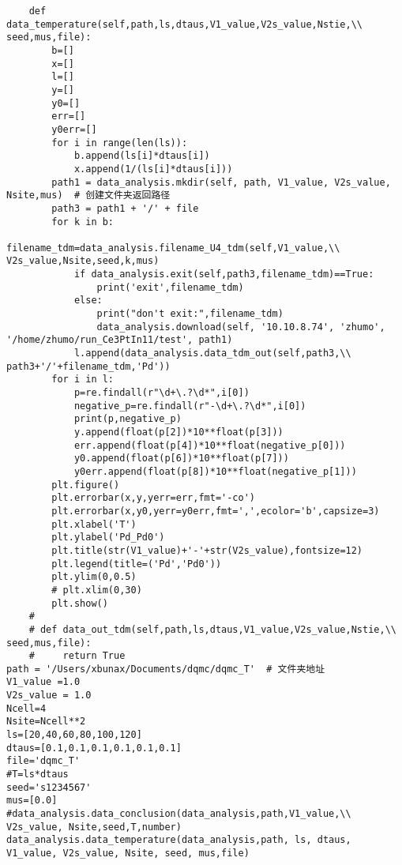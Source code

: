 \begin{description}
\begin{lstlisting}
    def data_temperature(self,path,ls,dtaus,V1_value,V2s_value,Nstie,\\ seed,mus,file):
        b=[]
        x=[]
        l=[]
        y=[]
        y0=[]
        err=[]
        y0err=[]
        for i in range(len(ls)):
            b.append(ls[i]*dtaus[i])
            x.append(1/(ls[i]*dtaus[i]))
        path1 = data_analysis.mkdir(self, path, V1_value, V2s_value, Nsite,mus)  # 创建文件夹返回路径
        path3 = path1 + '/' + file
        for k in b:
            filename_tdm=data_analysis.filename_U4_tdm(self,V1_value,\\ V2s_value,Nsite,seed,k,mus)
            if data_analysis.exit(self,path3,filename_tdm)==True:
                print('exit',filename_tdm)
            else:
                print("don't exit:",filename_tdm)
                data_analysis.download(self, '10.10.8.74', 'zhumo', '/home/zhumo/run_Ce3PtIn11/test', path1)
            l.append(data_analysis.data_tdm_out(self,path3,\\ path3+'/'+filename_tdm,'Pd'))
        for i in l:
            p=re.findall(r"\d+\.?\d*",i[0])
            negative_p=re.findall(r"-\d+\.?\d*",i[0])
            print(p,negative_p)
            y.append(float(p[2])*10**float(p[3]))
            err.append(float(p[4])*10**float(negative_p[0]))
            y0.append(float(p[6])*10**float(p[7]))
            y0err.append(float(p[8])*10**float(negative_p[1]))
        plt.figure()
        plt.errorbar(x,y,yerr=err,fmt='-co')
        plt.errorbar(x,y0,yerr=y0err,fmt=',',ecolor='b',capsize=3)
        plt.xlabel('T')
        plt.ylabel('Pd_Pd0')
        plt.title(str(V1_value)+'-'+str(V2s_value),fontsize=12)
        plt.legend(title=('Pd','Pd0'))
        plt.ylim(0,0.5)
        # plt.xlim(0,30)
        plt.show()
    #
    # def data_out_tdm(self,path,ls,dtaus,V1_value,V2s_value,Nstie,\\ seed,mus,file):
    #     return True
path = '/Users/xbunax/Documents/dqmc/dqmc_T'  # 文件夹地址
V1_value =1.0
V2s_value = 1.0
Ncell=4
Nsite=Ncell**2
ls=[20,40,60,80,100,120]
dtaus=[0.1,0.1,0.1,0.1,0.1,0.1]
file='dqmc_T'
#T=ls*dtaus
seed='s1234567'
mus=[0.0]
#data_analysis.data_conclusion(data_analysis,path,V1_value,\\ V2s_value, Nsite,seed,T,number)
data_analysis.data_temperature(data_analysis,path, ls, dtaus, V1_value, V2s_value, Nsite, seed, mus,file)





	\end{lstlisting}
\end{description}
